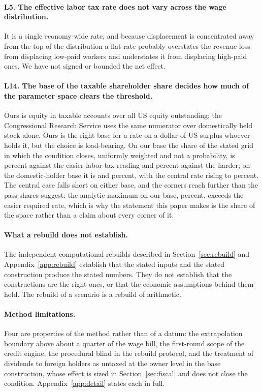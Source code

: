 \paragraph{L5. The effective labor tax rate does not vary across the wage distribution.} It is a
single economy-wide rate, and because displacement is concentrated away from the top of the
distribution a flat rate probably overstates the revenue loss from displacing low-paid workers and
understates it from displacing high-paid ones. We have not signed or bounded the net effect.

\paragraph{L14. The base of the taxable shareholder share decides how much of the parameter space
clears the threshold.} Ours is equity in taxable accounts over all US equity outstanding; the
Congressional Research Service uses the same numerator over domestically held stock alone. Ours is
the right base for a rate on a dollar of US surplus whoever holds it, but the choice is
load-bearing. On our base the share of the stated grid in which the condition closes, uniformly
weighted and not a probability, is  percent against the easier labor
tax reading and  percent against the harder; on the domestic-holder
base it is  and  percent, with the central rate
rising to  percent. The central case falls short on either base, and the corners
reach further than the pass shares suggest: the analytic maximum on our base,
 percent, exceeds the easier required rate, which is why the statement
this paper makes is the share of the space rather than a claim about every corner of it.

\paragraph{What a rebuild does not establish.} The independent computational rebuilds described
in Section~\ref{sec:rebuild} and Appendix~\ref{app:rebuild} establish that the stated inputs and
the stated construction produce the stated numbers. They do not establish that the constructions
are the right ones, or that the economic assumptions behind them hold. The rebuild of a scenario
is a rebuild of arithmetic.

\paragraph{Method limitations.} Four are properties of the method rather than of a datum: the
extrapolation boundary above about a quarter of the wage bill, the first-round scope of the credit
engine, the procedural blind in the rebuild protocol, and the treatment of dividends to foreign
holders as untaxed at the owner level in the base construction, whose effect is sized in
Section~\ref{sec:fiscal} and does not close the condition. Appendix~\ref{app:detail} states each
in full.

